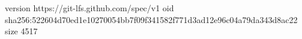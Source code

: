 version https://git-lfs.github.com/spec/v1
oid sha256:522604d70ed1e10270054bb7f09f341582f771d3ad12e96c04a79da343d8ac22
size 4517
